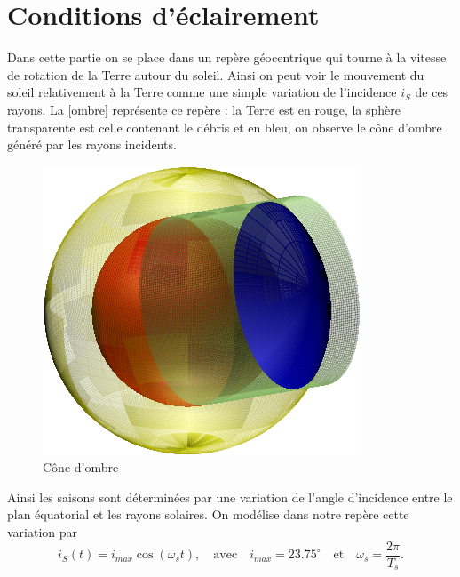 \documentclass[a4paper,11pt]{article}
\numberwithin{section}{part}
\begin{document}










\section{Conditions d'\'eclairement}

Dans cette partie on se place dans un rep\`ere g\'eocentrique qui tourne \`a la vitesse de rotation de la Terre autour du soleil. Ainsi on peut voir le mouvement du soleil relativement \`a la Terre comme une simple variation de l'incidence $i_S$ de ces rayons.  La \autoref{ombre} repr\'esente ce rep\`ere : la Terre est en rouge, la sph\`ere transparente est celle contenant le d\'ebris et en bleu, on observe le c\^one d'ombre g\'en\'er\'e par les rayons incidents. 

 \begin{figure}[ht]
    \centering
    \includegraphics[width=.6\textwidth]{figures/ombre.pdf}
    \caption{C\^one d'ombre}\label{ombre}
 \end{figure}
 
Ainsi les saisons sont d\'etermin\'ees par une variation de l'angle d'incidence entre le plan \'equatorial et les rayons solaires.
On mod\'elise dans notre rep\`ere cette variation par 
\[ i_{S}(t)= i_{max}\cos(\omega_{s}t), \quad \text{avec} \quad i_{max}=23.75^\circ \quad \text{et}  \quad \omega_s=\frac{2\pi}{T_s}.\]
 
\end{document}
